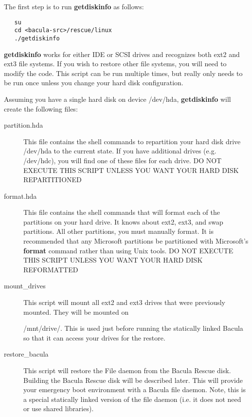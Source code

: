The first step is to run {\bf getdiskinfo} as follows: 

\footnotesize
\begin{verbatim}
   su
   cd <bacula-src>/rescue/linux
   ./getdiskinfo
\end{verbatim}
\normalsize

{\bf getdiskinfo} works for either IDE or SCSI drives and recognizes both ext2
and ext3 file systems. If you wish to restore other file systems, you will
need to modify the code. This script can be run multiple times, but really
only needs to be run once unless you change your hard disk configuration. 

Assuming you have a single hard disk on device /dev/hda, {\bf getdiskinfo}
will create the following files: 

\begin{description}

\item [partition.hda]
   This file contains the shell commands  to repartition your hard disk drive
/dev/hda to the current  state. If you have additional drives (e.g. /dev/hdc),
you  will find one of these files for each drive.  DO NOT EXECUTE THIS SCRIPT
UNLESS YOU WANT YOUR HARD DISK  REPARTITIONED  

\item [format.hda]
   This file contains the shell commands that  will format each of the partitions
on your hard drive. It  knows about ext2, ext3, and swap partitions. All other
partitions,  you must manually format. It is recommended that any Microsoft 
partitions be partitioned with Microsoft's {\bf format} command  rather than
using Unix tools.  DO NOT EXECUTE THIS SCRIPT UNLESS YOU WANT YOUR HARD DISK 
REFORMATTED  

\item [mount\_drives]
   This script will mount all ext2 and ext3  drives that were previously mounted.
They will be mounted on  

/mnt/drive/. This is used just before running the statically  linked Bacula so
that it can access your drives for the restore.  

\item [restore\_bacula]
   This script will restore the File daemon  from the Bacula Rescue disk.
Building the Bacula Rescue disk  will be described later. This will provide
your emergency boot  environment with a Bacula file daemon. Note, this is a
special  statically linked version of the file daemon (i.e. it does not  need
or use shared libraries).  


\end{description}

